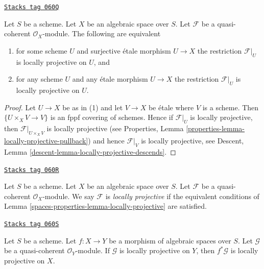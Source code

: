 \begin{lemma}
\label{spaces-properties-lemma-locally-projective}
\href{https://stacks.math.columbia.edu/tag/060Q}{\texttt{Stacks tag 060Q}}

Let $S$ be a scheme. Let $X$ be an algebraic space over $S$.
Let $\mathcal{F}$ be a quasi-coherent $\mathcal{O}_X$-module.
The following are equivalent
\begin{enumerate}
\item for some scheme $U$ and surjective \'etale morphism
$U \to X$ the restriction $\mathcal{F}|_U$ is locally projective
on $U$, and
\item for any scheme $U$ and any \'etale morphism
$U \to X$ the restriction $\mathcal{F}|_U$ is locally projective
on $U$.
\end{enumerate}
\end{lemma}

\begin{proof}
Let $U \to X$ be as in (1) and let $V \to X$ be \'etale where
$V$ is a scheme. Then $\{U \times_X V \to V\}$ is an fppf covering
of schemes. Hence if $\mathcal{F}|_U$ is locally projective, then
$\mathcal{F}|_{U \times_X V}$ is locally projective (see
Properties, Lemma \ref{properties-lemma-locally-projective-pullback})
and hence $\mathcal{F}|_V$ is locally projective, see
Descent, Lemma \ref{descent-lemma-locally-projective-descends}.
\end{proof}

\begin{definition}
\label{spaces-properties-definition-locally-projective}
\href{https://stacks.math.columbia.edu/tag/060R}{\texttt{Stacks tag 060R}}

Let $S$ be a scheme. Let $X$ be an algebraic space over $S$.
Let $\mathcal{F}$ be a quasi-coherent $\mathcal{O}_X$-module.
We say $\mathcal{F}$ is {\it locally projective}
if the equivalent conditions of
Lemma \ref{spaces-properties-lemma-locally-projective}
are satisfied.
\end{definition}

\begin{lemma}
\label{spaces-properties-lemma-locally-projective-pullback}
\href{https://stacks.math.columbia.edu/tag/060S}{\texttt{Stacks tag 060S}}

Let $S$ be a scheme.
Let $f : X \to Y$ be a morphism of algebraic spaces over $S$.
Let $\mathcal{G}$ be a quasi-coherent $\mathcal{O}_Y$-module.
If $\mathcal{G}$ is locally projective on $Y$, then $f^*\mathcal{G}$
is locally projective on $X$.
\end{lemma}

